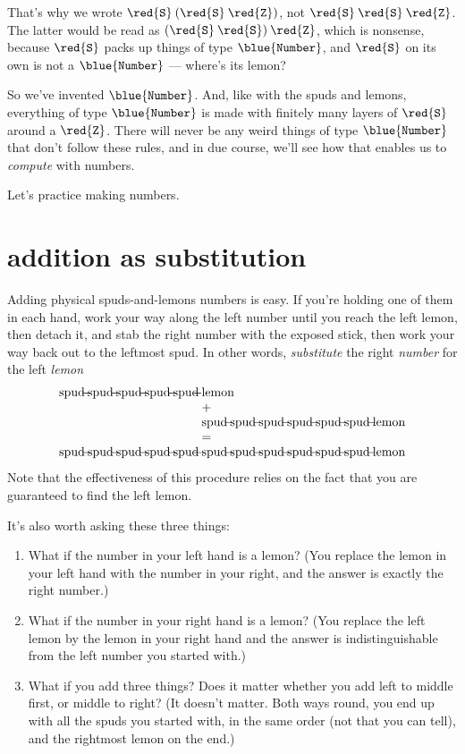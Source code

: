\documentclass{book}
\newcommand{\D}[1]{\blue{\mathtt{#1}}}
\newcommand{\C}[1]{\red{\mathtt{#1}}}
\newcommand{\Number}{\D{Number}}
\newcommand{\Ze}{\C{Z}}
\newcommand{\Su}{\C{S}}
\begin{document}
That's why we wrote $\Su\:(\Su\:\Ze)$, not $\Su\:\Su\:\Ze$. The latter would be read as $(\Su\:\Su)\:\Ze$, which is nonsense, because $\Su$ packs up things of type $\Number$, and $\Su$ on its own is not a $\Number$ --- where's its lemon?

So we've invented $\Number$. And, like with the spuds and lemons, everything of type $\Number$ is made with finitely many layers of $\Su$ around a $\Ze$. There will never be any weird things of type $\Number$ that don't follow these rules, and in due course, we'll see how that enables us to \emph{compute} with numbers.

Let's practice making numbers.


\section{addition as substitution}

Adding physical spuds-and-lemons numbers is easy. If you're holding one of them in each hand, work your way along the left number until you reach the left lemon, then detach it, and stab the right number with the exposed stick, then work your way back out to the leftmost spud. In other words, \emph{substitute} the right \emph{number} for the left \emph{lemon}
\[\begin{array}{l@{\;\,}l}
\spud\spud\spud\spud\spud&\lemon\\
&+ \\
&\spud\spud\spud\spud\spud\spud\lemon\\
&= \\
\spud\spud\spud\spud\spud&\spud\spud\spud\spud\spud\spud\lemon\\
\end{array}
\]
Note that the effectiveness of this procedure relies on the fact that you are guaranteed to find the left lemon.

It's also worth asking these three things:
\begin{enumerate}
\item What if the number in your left hand is a lemon? (You replace the lemon in your left hand with the number in your right, and the answer is exactly the right number.)
\item What if the number in your right hand is a lemon? (You replace the left lemon by the lemon in your right hand and the answer is indistinguishable from the left number you started with.)
\item What if you add three things? Does it matter whether you add left to middle first, or middle to right? (It doesn't matter. Both ways round, you end up with all the spuds you started with, in the same order (not that you can tell), and the rightmost lemon on the end.)
\end{enumerate}
\end{document}
